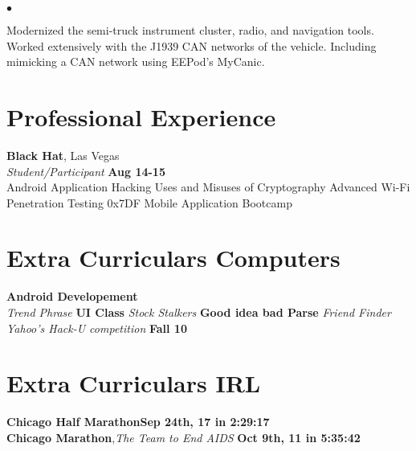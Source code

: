 \documentclass[margin,line]{res}
\newenvironment{list2}{
  \begin{list}{$\bullet$}{
      \setlength{\itemsep}{0in}
      \setlength{\parsep}{0in} \setlength{\parskip}{0in}
      \setlength{\topsep}{0in} \setlength{\partopsep}{0in} 
      \setlength{\leftmargin}{0.2in}}}{\end{list}}
\begin{document}
\begin{resume}
\begin{list2}
  \item Modernized the semi-truck instrument cluster, radio, and navigation tools. Worked extensively with the J1939 CAN networks of the vehicle. Including mimicking a CAN network using EEPod’s MyCanic.
\end{list2}



\section{\sc Professional Experience}

{\bf {Black Hat}}, {Las Vegas}\\
{\em Student/Participant } \hfill {\bf Aug 14-15}\\
Android Application Hacking
Uses and Misuses of Cryptography
Advanced Wi-Fi Penetration Testing
0x7DF Mobile Application Bootcamp

\section{\sc Extra Curriculars Computers}
{\bf Android Developement }\\
{\em Trend Phrase} \hfill {\bf  UI Class}
{\em Stock Stalkers} \hfill {\bf Good idea bad Parse}
{\em Friend Finder Yahoo’s Hack-U competition} \hfill {\bf Fall 10}


\section{\sc Extra Curriculars IRL}

{\bf Chicago Half Marathon}\hfill {\bf  Sep 24th, 17 in 2:29:17 }\\

{\bf Chicago Marathon},{\em  The Team to End AIDS} \hfill {\bf  Oct 9th, 11 in 5:35:42}\\



\end{resume}
\end{document}
